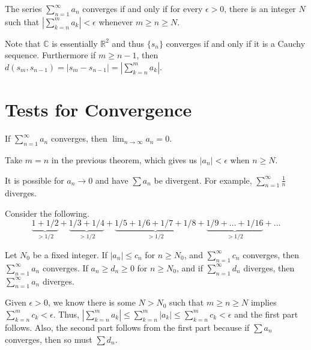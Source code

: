 \documentclass{mathnotes}
\newcommand{\cc}{\mathbb{C}}
\newcommand{\rr}{\mathbb{R}}
\begin{document}
\begin{prop}
  The series $\sum_{n=1}^\infty a_n$ converges if and only if for every
  $\epsilon>0$, there is an integer $N$ such that $|\sum_{k=n}^m a_k|<\epsilon$
  whenever $m\ge n\ge N$.
\end{prop}

\begin{pf}
  Note that $\cc$ is essentially $\rr^2$ and thus $\{s_n\}$ converges if and
  only if it is a Cauchy sequence. Furthermore if $m\ge n-1$, then
  $d(s_m,s_{n-1})=|s_m-s_{n-1}|=|\sum_{k=n}^m a_k|$.
\end{pf}

\section*{Tests for Convergence}

\begin{prop}
  If $\sum_{n=1}^\infty a_n$ converges, then $\lim_{n\to\infty}a_n=0$.
\end{prop}

\begin{pf}
  Take $m=n$ in the previous theorem, which gives us $|a_n|<\epsilon$ when
  $n\ge N$.
\end{pf}

\begin{note}
  It is possible for $a_n\to0$ and have $\sum a_n$ be divergent. For example,
  $\sum_{n=1}^\infty\frac{1}{n}$ diverges.
\end{note}

\begin{pfi}
  Consider the following.
  $$\underbrace{1+1/2}_{>1/2}+
  \underbrace{1/3+1/4}_{>1/2}+
  \underbrace{1/5+1/6+1/7+1/8}_{>1/2}+
  \underbrace{1/9+\ldots+1/16}_{>1/2}+\ldots$$
\end{pfi}

\begin{thm}
  Let $N_0$ be a fixed integer. If $|a_n|\le c_n$ for $n\ge N_0$, and
  $\sum_{n=1}^\infty c_n$ converges, then $\sum_{n=1}^\infty a_n$ converges. If
  $a_n\ge d_n\ge 0$ for $n\ge N_0$, and if $\sum_{n=1}^\infty d_n$ diverges,
  then $\sum_{n=1}^\infty a_n$ diverges.
\end{thm}

\begin{pf}
  Given $\epsilon>0$, we know there is some $N>N_0$ such that $m\ge n\ge N$
  implies $\sum_{k=n}^mc_k<\epsilon$. Thus,
  $|\sum_{k=n}^ma_k|\le\sum_{k=n}^m|a_k|\le\sum_{k=n}^mc_k<\epsilon$ and the
  first part follows. Also, the second part follows from the first part because
  if $\sum a_n$ converges, then so must $\sum d_n$.
\end{pf}
\end{document}
